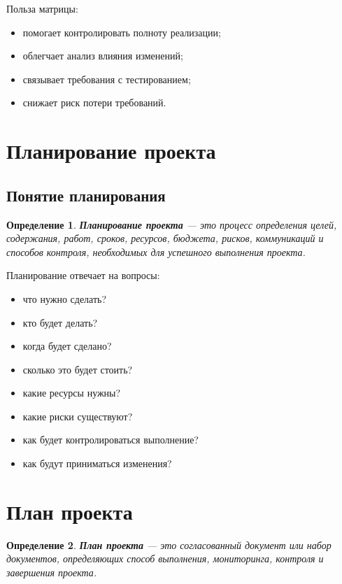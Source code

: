 \documentclass[12pt,a4paper]{article}
\newtheorem{definition}{Определение}
\begin{document}
Польза матрицы:
\begin{itemize}
    \item помогает контролировать полноту реализации;
    \item облегчает анализ влияния изменений;
    \item связывает требования с тестированием;
    \item снижает риск потери требований.
\end{itemize}

\section{Планирование проекта}

\subsection{Понятие планирования}

\begin{definition}
\textbf{Планирование проекта} --- это процесс определения целей, содержания, работ, сроков, ресурсов, бюджета, рисков, коммуникаций и способов контроля, необходимых для успешного выполнения проекта.
\end{definition}

Планирование отвечает на вопросы:
\begin{itemize}
    \item что нужно сделать?
    \item кто будет делать?
    \item когда будет сделано?
    \item сколько это будет стоить?
    \item какие ресурсы нужны?
    \item какие риски существуют?
    \item как будет контролироваться выполнение?
    \item как будут приниматься изменения?
\end{itemize}

\section{План проекта}

\begin{definition}
\textbf{План проекта} --- это согласованный документ или набор документов, определяющих способ выполнения, мониторинга, контроля и завершения проекта.
\end{definition}
\end{document}
